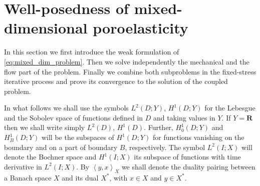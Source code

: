 \documentclass[a4paper]{article}
\numberwithin{equation}{section}
\def\dual#1#2{\left\langle #1,#2\right\rangle}
\def\Real{{\mathbf R}} %
\begin{document}
\section{Well-posedness of mixed-dimensional poroelasticity}\label{sec:well_pos}

In this section we first introduce the weak formulation of \eqref{eq:mixed_dim_problem}.
Then we solve independently the mechanical and the flow part of the problem.
Finally we combine both subproblems in the fixed-stress iterative process and prove its convergence to the solution of the coupled problem.

In what follows we shall use the symbols $L^2(D;Y)$, $H^1(D;Y)$ for the Lebesgue and the Sobolev space of functions defined in $D$ and taking values in $Y$.
If $Y=\Real$ then we shall write simply $L^2(D)$, $H^1(D)$.
Further, $H^1_0(D;Y)$ and $H^1_B(D;Y)$ will be the subspaces of $H^1(D;Y)$ for functions vanishing on the boundary and on a part of boundary $B$, respectively.
The symbol $L^2( I;X)$ will denote the Bochner space and $H^1( I;X)$ its subspace of functions with time derivative in $L^2( I;X)$.
By $\dual{y}{x}_X$ we shall denote the duality pairing between a Banach space $X$ and its dual $X^*$, with $x\in X$ and $y\in X^*$.
\end{document}
